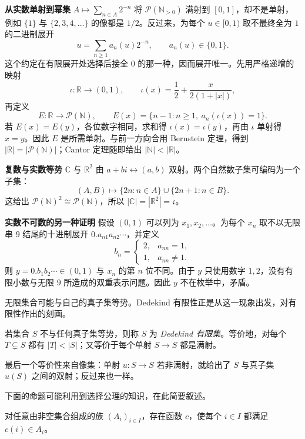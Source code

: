 \documentclass[lang=cn,a4paper,fontset=none,zihao=false,10pt,openany,twoside]{beautybook}
\numberwithin{algorithm}{chapter}
\newcommand{\N}{\mathbb N}
\newcommand{\R}{\mathbb R}
\newcommand{\C}{\mathbb C}
\newcommand{\Pow}{\mathcal P}
\begin{document}
\par\smallskip\noindent\textbf{从实数单射到幂集}\quad 
$A\mapsto\sum_{n\in A}2^{-n}$ 将 $\Pow(\N_{>0})$ 满射到 $[0,1]$，却不是单射，例如 $\{1\}$ 与 $\{2,3,4,\ldots\}$ 的像都是 $1/2$。反过来，为每个 $u\in[0,1)$ 取不最终全为 $1$ 的二进制展开
\[
 u=\sum_{n\ge1}a_n(u)2^{-n},\qquad a_n(u)\in\{0,1\}.
\]
这个约定在有限展开处选择后接全 $0$ 的那一种，因而展开唯一。先用严格递增的映射
\[
 \iota:\R\longrightarrow(0,1),\qquad
 \iota(x)=\frac12+\frac{x}{2(1+|x|)},
\]
再定义
\[
 E:\R\longrightarrow\Pow(\N),\qquad
 E(x)=\{n-1:n\ge1,\ a_n(\iota(x))=1\}.
\]
若 $E(x)=E(y)$，各位数字相同，求和得 $\iota(x)=\iota(y)$，再由 $\iota$ 单射得 $x=y$。因此 $E$ 是所需单射。与前一方向合用 Bernstein 定理，得到 $|\R|=|\Pow(\N)|$；Cantor 定理随即给出 $|\N|<|\R|$。


\par\smallskip\noindent\textbf{复数与实数等势}\quad 
$\C$ 与 $\R^2$ 由 $a+bi\leftrightarrow(a,b)$ 双射。两个自然数子集可编码为一个子集：
\[
 (A,B)\longmapsto\{2n:n\in A\}\cup\{2n+1:n\in B\}.
\]
这给出 $\Pow(\N)^2\cong\Pow(\N)$，所以 $|\C|=|\R^2|=\mathfrak c$。

\par\smallskip\noindent\textbf{实数不可数的另一种证明}\quad 
假设 $(0,1)$ 可以列为 $x_1,x_2,\ldots$。为每个 $x_n$ 取不以无限串 $9$ 结尾的十进制展开 $0.a_{n1}a_{n2}\cdots$，并定义
\[
 b_n=\begin{cases}2,&a_{nn}=1,\\1,&a_{nn}\neq1.\end{cases}
\]
则 $y=0.b_1b_2\cdots\in(0,1)$ 与 $x_n$ 的第 $n$ 位不同。由于 $y$ 只使用数字 $1,2$，没有有限小数与无限 $9$ 所造成的双重表示问题。因此 $y$ 不在枚举中，矛盾。


无限集合可能与自己的真子集等势。Dedekind 有限性正是从这一现象出发，对有限性作出的刻画。
\begin{definition}
若集合 $S$ 不与任何真子集等势，则称 $S$ 为 \emph{Dedekind 有限集}。等价地，对每个 $T\subsetneq S$ 都有 $|T|<|S|$；又等价于每个单射 $S\to S$ 都是满射。
\end{definition}
最后一个等价性来自像集：单射 $u:S\to S$ 若非满射，就给出了 $S$ 与真子集 $u(S)$ 之间的双射；反过来也一样。

下面的命题可能利用到选择公理的知识，在此简要叙述。

\begin{axiom}[选择公理]
对任意由非空集合组成的族 $(A_i)_{i\in I}$，存在函数 $c$，使每个 $i\in I$ 都满足 $c(i)\in A_i$。
\end{axiom}
\end{document}
